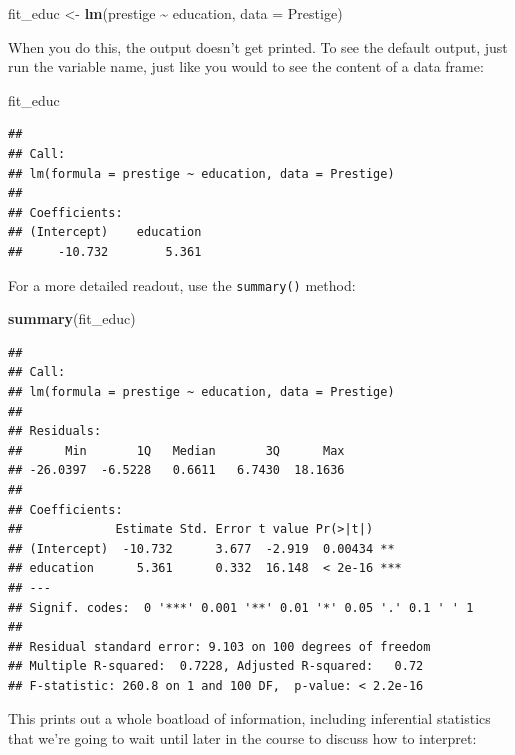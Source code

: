 \documentclass[
  12pt,
  oneside,openany]{book}
\newenvironment{Shaded}{\begin{snugshade}}{\end{snugshade}}
\newcommand{\DataTypeTok}[1]{\textcolor[rgb]{0.13,0.29,0.53}{#1}}
\newcommand{\KeywordTok}[1]{\textcolor[rgb]{0.13,0.29,0.53}{\textbf{#1}}}
\newcommand{\NormalTok}[1]{#1}
\newcommand{\OperatorTok}[1]{\textcolor[rgb]{0.81,0.36,0.00}{\textbf{#1}}}
\newcommand{\StringTok}[1]{\textcolor[rgb]{0.31,0.60,0.02}{#1}}
\begin{document}
\begin{Shaded}
\begin{Highlighting}[]
\NormalTok{fit\_educ <{-}}\StringTok{ }\KeywordTok{lm}\NormalTok{(prestige }\OperatorTok{\textasciitilde{}}\StringTok{ }\NormalTok{education, }\DataTypeTok{data =}\NormalTok{ Prestige)}
\end{Highlighting}
\end{Shaded}

When you do this, the output doesn't get printed. To see the default output, just run the variable name, just like you would to see the content of a data frame:

\begin{Shaded}
\begin{Highlighting}[]
\NormalTok{fit\_educ}
\end{Highlighting}
\end{Shaded}

\begin{verbatim}
## 
## Call:
## lm(formula = prestige ~ education, data = Prestige)
## 
## Coefficients:
## (Intercept)    education  
##     -10.732        5.361
\end{verbatim}

For a more detailed readout, use the \texttt{summary()} method:

\begin{Shaded}
\begin{Highlighting}[]
\KeywordTok{summary}\NormalTok{(fit\_educ)}
\end{Highlighting}
\end{Shaded}

\begin{verbatim}
## 
## Call:
## lm(formula = prestige ~ education, data = Prestige)
## 
## Residuals:
##      Min       1Q   Median       3Q      Max 
## -26.0397  -6.5228   0.6611   6.7430  18.1636 
## 
## Coefficients:
##             Estimate Std. Error t value Pr(>|t|)    
## (Intercept)  -10.732      3.677  -2.919  0.00434 ** 
## education      5.361      0.332  16.148  < 2e-16 ***
## ---
## Signif. codes:  0 '***' 0.001 '**' 0.01 '*' 0.05 '.' 0.1 ' ' 1
## 
## Residual standard error: 9.103 on 100 degrees of freedom
## Multiple R-squared:  0.7228, Adjusted R-squared:   0.72 
## F-statistic: 260.8 on 1 and 100 DF,  p-value: < 2.2e-16
\end{verbatim}

This prints out a whole boatload of information, including inferential statistics that we're going to wait until later in the course to discuss how to interpret:
\end{document}

